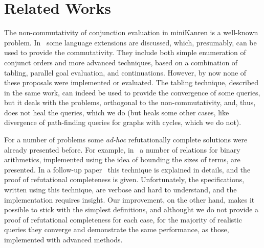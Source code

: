 \section{Related Works}
\label{sec:related_works}

The non-commutativity of conjunction evaluation in miniKanren is a well-known problem. In~\cite{WillThesis} some language extensions are discussed, which,
presumably, can be used to provide the commutativity. They include both simple enumeration of conjunct orders and more advanced techniques, based on a combination
of tabling, parallel goal evaluation, and continuations. However, by now none of these proposals were implemented or evaluated. The tabling technique,
described in the same work, can indeed be used to provide the convergence of some queries, but it deals with the problems, orthogonal to the non-commutativity, and,
thus, does not heal the queries, which we do (but heals some other cases, like divergence of path-finding queries for graphs with cycles, which we do not).

For a number of problems some \emph{ad-hoc} refutationally complete solutions were already presented before. For example, in~\cite{TRS} a number of relations for
binary arithmetics, implemented using the idea of bounding the sizes of terms, are presented. In a follow-up paper~\cite{KiselyovArithmetic} this technique is
explained in details, and the proof of refutational completeness is given. Unfortunately, the specifications, written using this technique, are verbose and
hard to understand, and the implementation requires insight. Our improvement, on the other hand, makes it possible to stick with the simplest definitions, and
althought we do not provide a proof of refutational completeness for each case, for the majority of realistic queries they converge and demonstrate the same
performance, as those, implemented with advanced methods.
